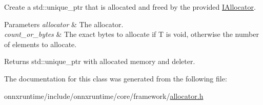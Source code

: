 Create a std\+::unique\+\_\+ptr that is allocated and freed by the provided \mbox{\hyperlink{classonnxruntime_1_1IAllocator}{I\+Allocator}}. 
\begin{DoxyParams}{Parameters}
{\em allocator} & The allocator. \\
\hline
{\em count\+\_\+or\+\_\+bytes} & The exact bytes to allocate if T is void, otherwise the number of elements to allocate. \\
\hline
\end{DoxyParams}
\begin{DoxyReturn}{Returns}
std\+::unique\+\_\+ptr with allocated memory and deleter. 
\end{DoxyReturn}


The documentation for this class was generated from the following file\+:\begin{DoxyCompactItemize}
\item 
onnxruntime/include/onnxruntime/core/framework/\mbox{\hyperlink{framework_2allocator_8h}{allocator.\+h}}\end{DoxyCompactItemize}
